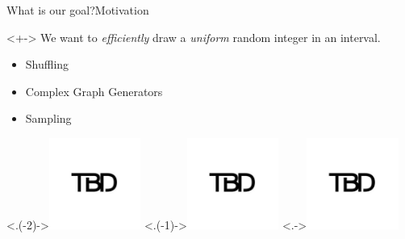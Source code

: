 \begin{frame}{What is our goal?}{Motivation}
    \pause 
    \begin{block}{}<+->
        We want to \emph{efficiently} draw a \emph{uniform} random integer in an interval.
    \end{block}
    
    \begin{itemize}[<+->]
        \item Shuffling
        \item Complex Graph Generators
        \item Sampling
    \end{itemize}

    \smallskip

	\begin{center}
		\onslide<.(-2)->{\includegraphics[height=3cm]{img/TBD.jpg}}
		\hfil
		\onslide<.(-1)->{\includegraphics[height=3cm]{img/TBD.jpg}}
		\hfil
		\onslide<.->{\includegraphics[height=3cm]{img/TBD.jpg}}
	\end{center}
\end{frame}